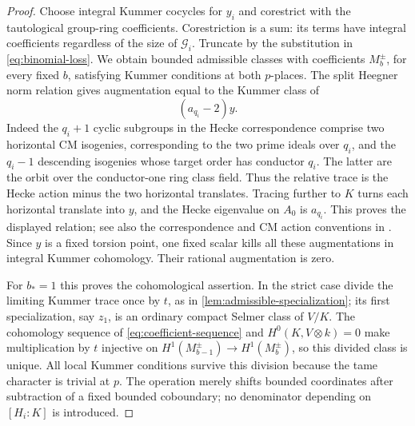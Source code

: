 \begin{proof}
Choose integral Kummer cocycles for $y_i$ and corestrict with the
tautological group-ring coefficients.  Corestriction is a sum:
its terms have integral coefficients regardless
of the size of $\mathcal G_i$.  Truncate by the substitution in
\cref{eq:binomial-loss}.  We obtain bounded admissible classes
with coefficients $M_b^{\pm}$, for every fixed $b$, satisfying
Kummer conditions at both $p$-places.  The split Heegner norm
relation gives augmentation equal to the Kummer class of
\[
 (a_{q_i}-2)y.
\]
Indeed the $q_i+1$ cyclic subgroups in the Hecke correspondence
comprise two horizontal CM isogenies, corresponding to the two
prime ideals over $q_i$, and the $q_i-1$ descending isogenies
whose target order has conductor $q_i$.  The latter are the
orbit over the conductor-one ring class field.  Thus the relative
trace is the Hecke action minus the two horizontal translates.
Tracing further to $K$ turns each horizontal translate into $y$,
and the Hecke eigenvalue on $A_0$ is $a_{q_i}$.  This proves the
displayed relation; see also the correspondence and CM action
conventions in \cite[Chapter~I, Sections~2--3]{GrossZagier1986}.
Since $y$ is a fixed torsion point, one
fixed scalar kills all these augmentations in integral Kummer
cohomology.  Their rational augmentation is zero.

For $b_*=1$ this proves the cohomological assertion.  In the
strict case divide the limiting Kummer trace once by $t$, as in
\cref{lem:admissible-specialization}; its first specialization,
say $z_1$, is an ordinary compact Selmer class of $V/K$.  The
cohomology sequence of \cref{eq:coefficient-sequence} and
$H^0(K,V\otimes k)=0$ make multiplication by $t$ injective on
$H^1(M_{b-1}^{\pm})\to H^1(M_b^{\pm})$, so this divided class
is unique.  All local Kummer conditions survive this division because the tame
character is trivial at $p$.  The operation merely shifts bounded
coordinates after subtraction of a fixed bounded coboundary; no
denominator depending on $[H_i:K]$ is introduced.


\end{proof}

